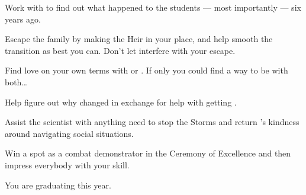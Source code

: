 \documentclass[char]{GL2020}
\begin{document}
\begin{itemz}
    \item Work with \cPresident{} to find out what happened to the students — most importantly \cHeirSibling{} — six years ago.
    \item Escape the \cHeir{\formal} family by making \cAmbition{} the Heir in your place, and help smooth the transition as best you can. Don’t let \cDiplomat{} interfere with your escape.
    \item Find love on your own terms with \cChupStudent{} or \cPresident{}. If only you could find a way to be with both\ldots{}
    \item Help \cWarlordDaughter{} figure out why \cLoud{} changed in exchange for \cWarlordDaughter{\their} help with getting \iMirror{}.
\end{itemz}

\begin{itemz}
    \item Assist \cAssistantScientist{} the scientist with anything \cAssistantScientist{\they} need\cAssistantScienist{\verbs} to stop the Storms and return \cAssistantScientist{}’s kindness around navigating social situations.
    \item Win a spot as a combat demonstrator in the Ceremony of Excellence and then impress everybody with your skill.
\end{itemz}

\begin{itemz}[Notes]
    \item You are graduating this year.
\end{itemz}
\end{document}
